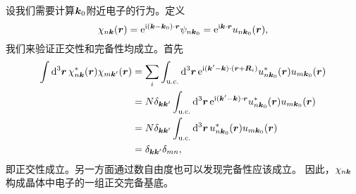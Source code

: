 设我们需要计算$\vb*{k}_0$附近电子的行为。定义
\begin{equation}
    \chi_{n \vb*{k}}(\vb*{r}) = \mathrm{e}^{\mathrm{i} (\vb*{k} - \vb*{k}_0) \cdot \vb*{r}} \psi_{n \vb*{k}_0} = \mathrm{e}^{\mathrm{i} \vb*{k} \cdot \vb*{r}} u_{n \vb*{k}_0} (\vb*{r}),
\end{equation}
我们来验证正交性和完备性均成立。首先
\[
    \begin{aligned}
        \int \dd[3]{\vb*{r}} \chi^*_{n \vb*{k}}(\vb*{r}) \chi_{m \vb*{k}'}(\vb*{r}) &= \sum_{i} \int_\text{u.c.} \dd[3]{\vb*{r}} \mathrm{e}^{\mathrm{i} (\vb*{k}' - \vb*{k}) \cdot (\vb*{r} + \vb*{R}_i)} u^*_{n \vb*{k}_0}(\vb*{r}) u_{m \vb*{k}_0}(\vb*{r}) \\
        &= N \delta_{\vb*{k} \vb*{k}'} \int_\text{u.c.} \dd[3]{\vb*{r}} \mathrm{e}^{\mathrm{i} (\vb*{k}' - \vb*{k}) \cdot \vb*{r}} u^*_{n \vb*{k}_0}(\vb*{r}) u_{m \vb*{k}_0}(\vb*{r}) \\
        &= N \delta_{\vb*{k} \vb*{k}'} \int_\text{u.c.} \dd[3]{\vb*{r}} u^*_{n \vb*{k}_0}(\vb*{r}) u_{m \vb*{k}_0}(\vb*{r}) \\
        &= \delta_{\vb*{k} \vb*{k}'} \delta_{mn},
    \end{aligned}
\]
即正交性成立。另一方面通过数自由度也可以发现完备性应该成立。
因此，$\chi_{n \vb*{k}}$构成晶体中电子的一组正交完备基底。

